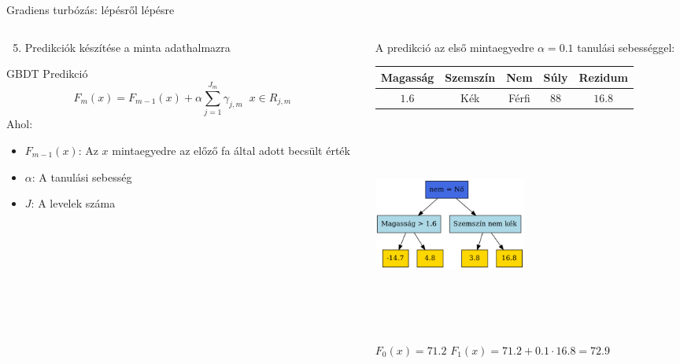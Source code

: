 \documentclass[english, aspectratio=169]{beamer}
\begin{document}
\begin{frame}{Gradiens turbózás: lépésről lépésre}
\begin{columns}
\begin{column}{.5\textwidth}
\begin{enumerate}
	\setcounter{enumi}{4}
	\item Predikciók készítése a minta adathalmazra
\end{enumerate}
\begin{block}{GBDT Predikció}
\[
F_m\left( x \right) = F_{m-1}\left( x \right) + \alpha \sum_{j=1}^{J_m} \gamma_{j,m}\;\; x \in R_{j,m}
\]
Ahol:
\begin{itemize}
	\item $F_{m-1}\left( x \right)$: Az $x$ mintaegyedre az előző fa által adott becsült érték
	\item $\alpha$: A tanulási sebesség
	\item $J$: A levelek száma
\end{itemize}
\end{block}
\end{column}
\begin{column}{.5\textwidth}
A predikció az első mintaegyedre $\alpha = 0.1$ tanulási sebességgel:
\vspace{-0.5cm}
\begin{center}
\begin{small}
\begin{tabular}{|c|c|c|c|c|}
\hline
Magasság & Szemszín & Nem & Súly & Rezidum \\ \hline
$1.6$      & Kék      & Férfi & $88$  & $16.8$   \\ \hline
\end{tabular}
\end{small}
\end{center}
\begin{center}
\includegraphics[width=5cm, height=7cm, keepaspectratio]{graphs/ensemble_6.png}
\end{center}
$F_0\left( x \right) = 71.2$
$F_1\left( x \right) = 71.2 + 0.1 \cdot 16.8 = 72.9$
\end{column}
\end{columns}
\end{frame}
\end{document}
